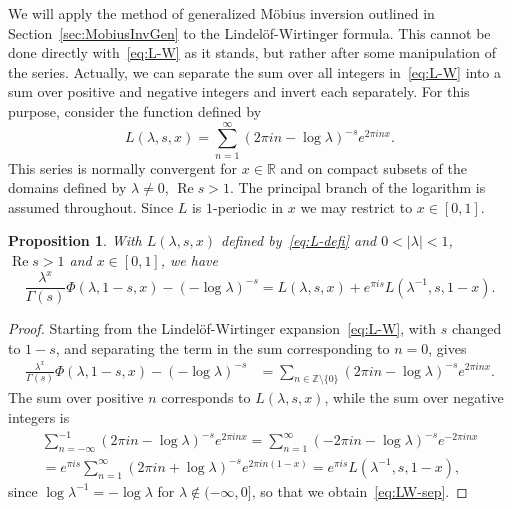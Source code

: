 \documentclass[11pt,a4paper,reqno]{amsart}
\newcommand{\R}{\mathbb{R}}
\newcommand{\Z}{\mathbb{Z}}
\renewcommand{\Re}{\operatorname{Re}}
\theoremstyle{plain}
\newtheorem{prop}[theorem]{Proposition}
\theoremstyle{remark}
\numberwithin{equation}{section}
\begin{document}
We will apply the method of generalized M\"obius inversion outlined in Section~\ref{sec:MobiusInvGen} to the Lindel\"of-Wirtinger formula. This cannot be done directly with~\eqref{eq:L-W} as it stands, but rather after some manipulation of the series. Actually, we can separate the sum over all integers in~\eqref{eq:L-W} into a sum over positive and negative integers and invert each separately. For this purpose, consider the function defined by
%
\begin{equation}
\label{eq:L-defi}
	L(\lambda,s,x) = \sum_{n=1}^{\infty} (2\pi i n - \log\lambda)^{-s} e^{2\pi i nx}.
\end{equation}
%
This series is normally convergent for $x \in \R$ and on compact subsets of the domains defined by $\lambda \neq 0$, $\Re s > 1$. The principal branch of the logarithm is assumed throughout. Since $L$ is $1$-periodic in $x$ we may restrict to $x \in [0,1]$.


\begin{prop}
\label{prop:LW-sep}
With $L(\lambda,s,x)$ defined by~\eqref{eq:L-defi} and $0 < |\lambda| < 1$, $\Re s > 1$ and $x \in [0,1]$, we have
%
\begin{equation}
\label{eq:LW-sep}
	  \frac{\lambda^{x}}{\Gamma(s)}\Phi(\lambda,1-s,x) - (-\log \lambda)^{-s}
	= L(\lambda,s,x) + e^{\pi i s} L(\lambda^{-1},s,1-x).
\end{equation}
%
\end{prop}

\begin{proof}
Starting from the Lindel\"of-Wirtinger expansion~\eqref{eq:L-W}, with $s$ changed to $1-s$, and separating the term in the sum corresponding to $n=0$, gives
%
\begin{align*}
	   \frac{\lambda^{x}}{\Gamma(s)}\Phi(\lambda,1-s,x) - (-\log \lambda)^{-s}
	&= \sum_{n \in \Z \setminus \{0\}} (2 \pi i n - \log\lambda)^{-s} e^{2\pi i n x}.
\end{align*}
%
The sum over positive $n$ corresponds to $L(\lambda,s,x)$, while the sum over negative integers is
%
\begin{multline*}
	   \sum_{n=-\infty}^{-1} (2 \pi i n - \log\lambda)^{-s} e^{2\pi i n x}
	 = \sum_{n=1}^{\infty} (-2 \pi i n - \log\lambda)^{-s} e^{-2\pi i n x}
	\\
	 = e^{\pi i s} \sum_{n=1}^{\infty} (2 \pi i n + \log\lambda)^{-s} e^{2\pi i n (1-x)} 
	 = e^{\pi i s} L(\lambda^{-1},s,1-x),
\end{multline*}
%
since $\log \lambda^{-1} = -\log\lambda$ for $\lambda \notin (-\infty,0]$,
so that we obtain~\eqref{eq:LW-sep}.
\end{proof}
\end{document}
